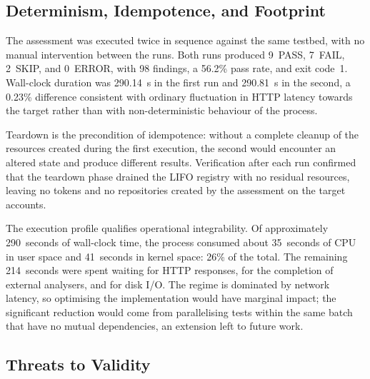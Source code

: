 \subsection{Determinism, Idempotence, and Footprint}

The assessment was executed twice in sequence against the same testbed, with no manual intervention between the runs.
Both runs produced 9~PASS, 7~FAIL, 2~SKIP, and 0~ERROR, with 98 findings, a 56.2\% pass rate, and exit code~1.
Wall-clock duration was 290.14~s in the first run and 290.81~s in the second, a 0.23\% difference consistent with ordinary fluctuation in HTTP latency towards the target rather than with non-deterministic behaviour of the process.

Teardown is the precondition of idempotence: without a complete cleanup of the resources created during the first execution, the second would encounter an altered state and produce different results.
Verification after each run confirmed that the teardown phase drained the LIFO registry with no residual resources, leaving no tokens and no repositories created by the assessment on the target accounts.

The execution profile qualifies operational integrability.
Of approximately 290~seconds of wall-clock time, the process consumed about 35~seconds of CPU in user space and 41~seconds in kernel space: 26\% of the total.
The remaining 214~seconds were spent waiting for HTTP responses, for the completion of external analysers, and for disk I/O.
The regime is dominated by network latency, so optimising the implementation would have marginal impact; the significant reduction would come from parallelising tests within the same batch that have no mutual dependencies, an extension left to future work.

\subsection{Threats to Validity}
\label{sec:threats}


